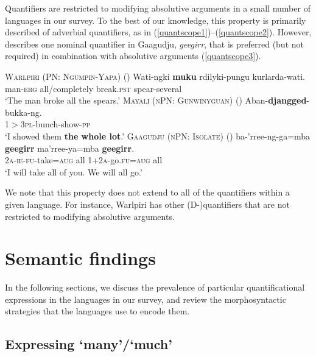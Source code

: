 \documentclass[12pt,egregdoesnotlikesansseriftitles]{scrartcl}
\begin{document}
Quantifiers are restricted to modifying absolutive arguments in a small number of languages in our survey. To the best of our knowledge, this property is primarily described of adverbial quantifiers, as in (\ref{quantscope1})--(\ref{quantscope2}). However, \cite{harvey92} describes one nominal quantifier in Gaagudju, \textit{geegirr}, that is preferred (but not required) in combination with absolutive arguments (\ref{quantscope3}).

\begin{exe}
  \ex  \textsc{Warlpiri (PN: Ngumpin-Yapa)} (\citealt[15]{bowler17})
  \gll Wati-ngki \textbf{muku} rdilyki-pungu kurlarda-wati.\\
  man-\textsc{erg} all/completely break.\textsc{pst} spear-several\\
  \glt `The man broke all the spears.' \label{quantscope1}
  \ex \textsc{Mayali (nPN: Gunwinyguan)} (\citealt[233]{evans95})
  \gll Aban-\textbf{djangged}-bukka-ng.\\
  1$>$3\textsc{pl}-bunch-show-\textsc{pp}\\
  \glt `I showed them \textbf{the whole lot}.' \label{quantscope2}
    \ex  \textsc{Gaagudju (nPN: Isolate)} (\citealt[307]{harvey92})
  \gll ba-'rree-ng-ga=mba \textbf{geegirr} ma'rree-ya=mba \textbf{geegirr}.\\ 
  2\textsc{a-ie-fu}-take=\textsc{aug} all 1+2\textsc{a}-go.\textsc{fu=aug} all\\
  \glt `I will take all of you. We will all go.' \label{quantscope3}
\end{exe}

We note that this property does not extend to all of the quantifiers within a given language. For instance, Warlpiri has other (D-)quantifiers that are not restricted to modifying absolutive arguments.


\section{Semantic findings \label{individquantsection}}

In the following sections, we discuss the prevalence of particular quantificational expressions in the languages in our survey, and review the morphosyntactic strategies that the languages use to encode them.

\subsection{Expressing `many'/`much' \label{manymuchsection}}
\end{document}
